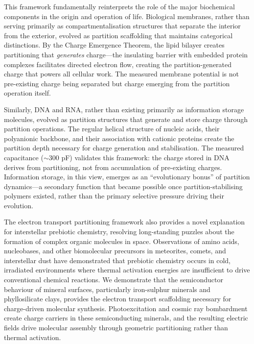 \documentclass[12pt,a4paper]{article}
\begin{document}
This framework fundamentally reinterprets the role of the major biochemical components in the origin and operation of life. Biological membranes, rather than serving primarily as compartmentalisation structures that separate the interior from the exterior, evolved as partition scaffolding that maintains categorical distinctions. By the Charge Emergence Theorem, the lipid bilayer creates partitioning that \emph{generates} charge---the insulating barrier with embedded protein complexes facilitates directed electron flow, creating the partition-generated charge that powers all cellular work. The measured membrane potential is not pre-existing charge being separated but charge emerging from the partition operation itself.

Similarly, DNA and RNA, rather than existing primarily as information storage molecules, evolved as partition structures that generate and store charge through partition operations. The regular helical structure of nucleic acids, their polyanionic backbone, and their association with cationic proteins create the partition depth necessary for charge generation and stabilisation. The measured capacitance ($\sim 300$ pF) validates this framework: the charge stored in DNA derives from partitioning, not from accumulation of pre-existing charges. Information storage, in this view, emerges as an ``evolutionary bonus'' of partition dynamics---a secondary function that became possible once partition-stabilising polymers existed, rather than the primary selective pressure driving their evolution.

The electron transport partitioning framework also provides a novel explanation for interstellar prebiotic chemistry, resolving long-standing puzzles about the formation of complex organic molecules in space. Observations of amino acids, nucleobases, and other biomolecular precursors in meteorites, comets, and interstellar dust have demonstrated that prebiotic chemistry occurs in cold, irradiated environments where thermal activation energies are insufficient to drive conventional chemical reactions. We demonstrate that the semiconductor behaviour of mineral surfaces, particularly iron-sulphur minerals and phyllosilicate clays, provides the electron transport scaffolding necessary for charge-driven molecular synthesis. Photoexcitation and cosmic ray bombardment create charge carriers in these semiconducting minerals, and the resulting electric fields drive molecular assembly through geometric partitioning rather than thermal activation.
\end{document}
